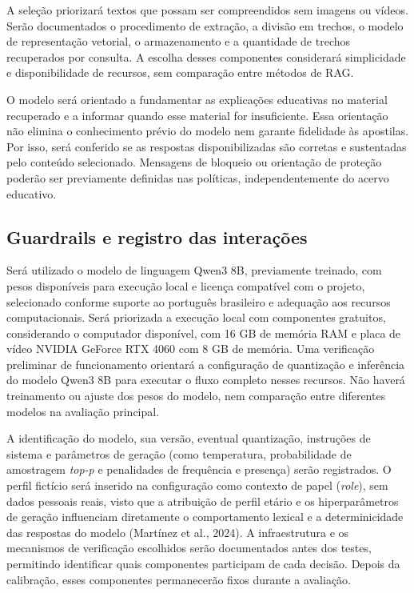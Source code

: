 \documentclass[12pt,openany,oneside,a4paper,english,brazil]{abntex2}
\begin{document}
A seleção priorizará textos que possam ser compreendidos sem imagens ou vídeos. Serão documentados o procedimento de extração, a divisão em trechos, o modelo de representação vetorial, o armazenamento e a quantidade de trechos recuperados por consulta. A escolha desses componentes considerará simplicidade e disponibilidade de recursos, sem comparação entre métodos de RAG.

O modelo será orientado a fundamentar as explicações educativas no material recuperado e a informar quando esse material for insuficiente. Essa orientação não elimina o conhecimento prévio do modelo nem garante fidelidade às apostilas. Por isso, será conferido se as respostas disponibilizadas são corretas e sustentadas pelo conteúdo selecionado. Mensagens de bloqueio ou orientação de proteção poderão ser previamente definidas nas políticas, independentemente do acervo educativo.

\subsection{Guardrails e registro das interações}\label{subsec:guardrails_registro}

Será utilizado o modelo de linguagem Qwen3 8B, previamente treinado, com pesos disponíveis para execução local e licença compatível com o projeto, selecionado conforme suporte ao português brasileiro e adequação aos recursos computacionais. Será priorizada a execução local com componentes gratuitos, considerando o computador disponível, com 16 GB de memória RAM e placa de vídeo NVIDIA GeForce RTX 4060 com 8 GB de memória. Uma verificação preliminar de funcionamento orientará a configuração de quantização e inferência do modelo Qwen3 8B para executar o fluxo completo nesses recursos. Não haverá treinamento ou ajuste dos pesos do modelo, nem comparação entre diferentes modelos na avaliação principal.

A identificação do modelo, sua versão, eventual quantização, instruções de sistema e parâmetros de geração (como temperatura, probabilidade de amostragem \textit{top-p} e penalidades de frequência e presença) serão registrados. O perfil fictício será inserido na configuração como contexto de papel (\textit{role}), sem dados pessoais reais, visto que a atribuição de perfil etário e os hiperparâmetros de geração influenciam diretamente o comportamento lexical e a determinicidade das respostas do modelo (Martínez et al., 2024). A infraestrutura e os mecanismos de verificação escolhidos serão documentados antes dos testes, permitindo identificar quais componentes participam de cada decisão. Depois da calibração, esses componentes permanecerão fixos durante a avaliação.
\end{document}
